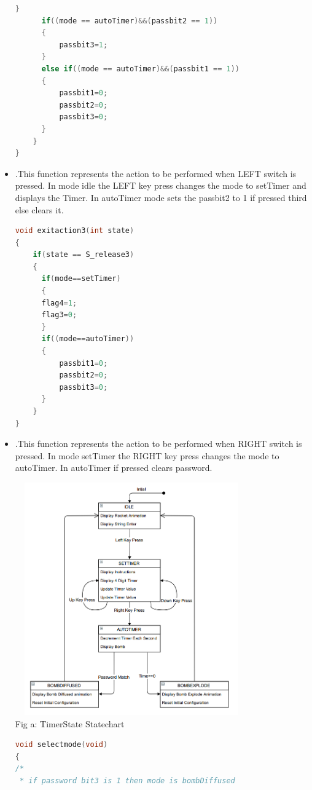 \documentclass{article}
\begin{document}
\begin{itemize}
\begin{lstlisting}[basicstyle = \small, language = C]
      }
      if((mode == autoTimer)&&(passbit2 == 1))
      {
          passbit3=1;
      }
      else if((mode == autoTimer)&&(passbit1 == 1))
      {
          passbit1=0;
          passbit2=0;
          passbit3=0;
      }
    }
}
  \end{lstlisting}
  \item {}.This function represents the action to be performed when LEFT switch is pressed. In mode idle the LEFT key press changes the mode to setTimer and displays the Timer. In autoTimer mode sets the passbit2 to 1 if pressed third else clears it.  
      \begin{lstlisting}[basicstyle = \small, language = C]
void exitaction3(int state)
{
    if(state == S_release3)
    {
      if(mode==setTimer)
      {
      flag4=1;
      flag3=0;
      }
      if((mode==autoTimer))
      {
          passbit1=0;
          passbit2=0;
          passbit3=0;
      }
    }
}
  \end{lstlisting}
  \item {}.This function represents the action to be performed when RIGHT switch is pressed. In mode setTimer the RIGHT key press changes the mode to autoTimer. In autoTimer if pressed clears password.
    \begin{center}
\includegraphics[width=10cm,height=10cm]{BombTimerStateChart}
\\{\small Fig a: TimerState Statechart} 
\end{center}
      \begin{lstlisting}[basicstyle = \small, language = C]
void selectmode(void)
{
/*
 * if password bit3 is 1 then mode is bombDiffused

\end{lstlisting}
\end{itemize}
\end{document}
